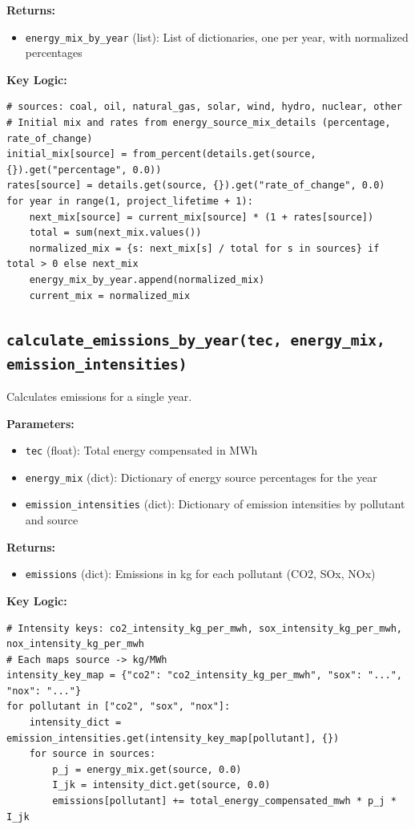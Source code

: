 \documentclass[ctcc_full_documentation.tex]{subfiles}
\begin{document}
\textbf{Returns:}
\begin{itemize}
    \item \texttt{energy\_mix\_by\_year} (list): List of dictionaries, one per year, with normalized percentages
\end{itemize}

\textbf{Key Logic:}
\begin{lstlisting}
# sources: coal, oil, natural_gas, solar, wind, hydro, nuclear, other
# Initial mix and rates from energy_source_mix_details (percentage, rate_of_change)
initial_mix[source] = from_percent(details.get(source, {}).get("percentage", 0.0))
rates[source] = details.get(source, {}).get("rate_of_change", 0.0)
for year in range(1, project_lifetime + 1):
    next_mix[source] = current_mix[source] * (1 + rates[source])
    total = sum(next_mix.values())
    normalized_mix = {s: next_mix[s] / total for s in sources} if total > 0 else next_mix
    energy_mix_by_year.append(normalized_mix)
    current_mix = normalized_mix
\end{lstlisting}

\subsection{\texttt{calculate\_emissions\_by\_year(tec, energy\_mix, emission\_intensities)}}

Calculates emissions for a single year.

\textbf{Parameters:}
\begin{itemize}
    \item \texttt{tec} (float): Total energy compensated in MWh
    \item \texttt{energy\_mix} (dict): Dictionary of energy source percentages for the year
    \item \texttt{emission\_intensities} (dict): Dictionary of emission intensities by pollutant and source
\end{itemize}

\textbf{Returns:}
\begin{itemize}
    \item \texttt{emissions} (dict): Emissions in kg for each pollutant (CO2, SOx, NOx)
\end{itemize}

\textbf{Key Logic:}
\begin{lstlisting}
# Intensity keys: co2_intensity_kg_per_mwh, sox_intensity_kg_per_mwh, nox_intensity_kg_per_mwh
# Each maps source -> kg/MWh
intensity_key_map = {"co2": "co2_intensity_kg_per_mwh", "sox": "...", "nox": "..."}
for pollutant in ["co2", "sox", "nox"]:
    intensity_dict = emission_intensities.get(intensity_key_map[pollutant], {})
    for source in sources:
        p_j = energy_mix.get(source, 0.0)
        I_jk = intensity_dict.get(source, 0.0)
        emissions[pollutant] += total_energy_compensated_mwh * p_j * I_jk
\end{lstlisting}
\end{document}
